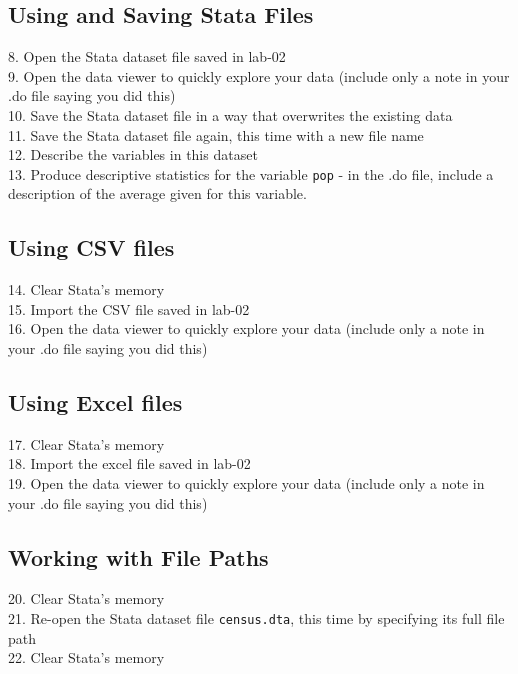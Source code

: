 \documentclass[letterpaper,11pt]{article}
\begin{document}
\subsection*{Using and Saving Stata Files}
8. Open the Stata dataset file saved in lab-02 \\
9. Open the data viewer to quickly explore your data (include only a note in your .do file saying you did this)\\
10. Save the Stata dataset file in a way that overwrites the existing data\\
11. Save the Stata dataset file again, this time with a new file name\\
12. Describe the variables in this dataset\\
13. Produce descriptive statistics for the variable \texttt{pop} - in the .do file, include a description of the average given for this variable.\\

\subsection*{Using CSV files}
14. Clear Stata's memory\\
15. Import the CSV file saved in lab-02\\
16. Open the data viewer to quickly explore your data (include only a note in your .do file saying you did this)\\

\subsection*{Using Excel files}
17. Clear Stata's memory\\
18. Import the excel file saved in lab-02\\
19. Open the data viewer to quickly explore your data (include only a note in your .do file saying you did this)\\

\subsection*{Working with File Paths}
20. Clear Stata's memory\\
21. Re-open the Stata dataset file \texttt{census.dta}, this time by specifying its full file path\\
22. Clear Stata's memory\\

\end{document}
